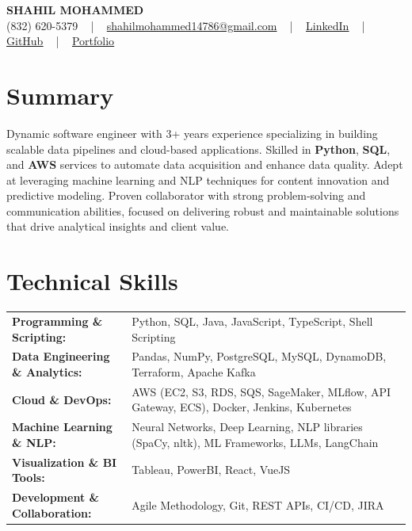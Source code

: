 \documentclass[letterpaper,11pt]{article}
\begin{document}
\begin{center}
    {\fontsize{14pt}{12pt}\selectfont \textbf{\MakeUppercase{Shahil Mohammed}}}\\ \vspace{2pt}
    \fontsize{10pt}{12pt}\selectfont (832) 620-5379 ~ | ~ \href{mailto:shahilmohammed14786@gmail.com}{shahilmohammed14786@gmail.com} ~ | ~  
    \href{https://www.linkedin.com/in/shahil-mohammed-9652931a1/}{\color{blue}\underline{LinkedIn}}  ~ | ~ 
    \href{https://github.com/freakbeast14}{\color{blue}\underline{GitHub}} ~ | ~ 
    \href{https://shahil-mohammed.netlify.app/}{\color{blue}\underline{Portfolio}}
    \vspace{-8pt}
\end{center}

\section{Summary}
\fontsize{9pt}{10pt}\selectfont
Dynamic software engineer with 3+ years experience specializing in building scalable data pipelines and cloud-based applications. Skilled in \textbf{Python}, \textbf{SQL}, and \textbf{AWS} services to automate data acquisition and enhance data quality. Adept at leveraging machine learning and NLP techniques for content innovation and predictive modeling. Proven collaborator with strong problem-solving and communication abilities, focused on delivering robust and maintainable solutions that drive analytical insights and client value.
 \vspace{-5pt}
 
\section{Technical Skills}
        \vspace{-14pt}
        \begin{table}[h]
            \fontsize{9pt}{10pt}\selectfont
            \begin{tabular}{p{0.3\linewidth} p{0.7\linewidth}}
                \textbf{Programming \& Scripting:} & Python, SQL, Java, JavaScript, TypeScript, Shell Scripting \\
                \textbf{Data Engineering \& Analytics:} & Pandas, NumPy, PostgreSQL, MySQL, DynamoDB, Terraform, Apache Kafka \\
                \textbf{Cloud \& DevOps:} & AWS (EC2, S3, RDS, SQS, SageMaker, MLflow, API Gateway, ECS), Docker, Jenkins, Kubernetes \\
                \textbf{Machine Learning \& NLP:} & Neural Networks, Deep Learning, NLP libraries (SpaCy, nltk), ML Frameworks, LLMs, LangChain \\
                \textbf{Visualization \& BI Tools:} & Tableau, PowerBI, React, VueJS \\
                \textbf{Development \& Collaboration:} & Agile Methodology, Git, REST APIs, CI/CD, JIRA \\                
            \end{tabular}
        \end{table}
 \vspace{-15pt}
 
\end{document}
